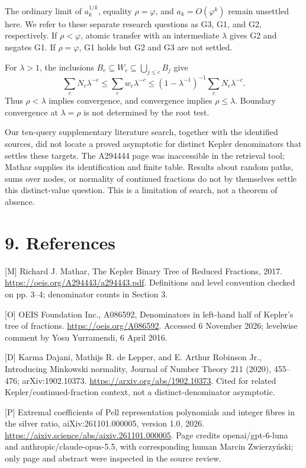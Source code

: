 \documentclass[11pt]{article}
\begin{document}
The ordinary limit of \(a_k^{1/k}\), equality \(\rho=\varphi\), and \(a_k=O(\varphi^k)\) remain unsettled here. We refer to these separate research questions as G3, G1, and G2, respectively. If \(\rho<\varphi\), atomic transfer with an intermediate \(\lambda\) gives G2 and negates G1. If \(\rho=\varphi\), G1 holds but G2 and G3 are not settled.

For \(\lambda>1\), the inclusions \(B_c\subseteq W_c\subseteq\bigcup_{j\le c}B_j\) give
\[
\sum_cN_c\lambda^{-c}\le\sum_cw_c\lambda^{-c}
\le(1-\lambda^{-1})^{-1}\sum_cN_c\lambda^{-c}.
\]
Thus \(\rho<\lambda\) implies convergence, and convergence implies \(\rho\le\lambda\). Boundary convergence at \(\lambda=\rho\) is not determined by the root test.

Our ten-query supplementary literature search, together with the identified sources, did not locate a proved asymptotic for distinct Kepler denominators that settles these targets. The A294444 page was inaccessible in the retrieval tool; Mathar supplies its identification and finite table. Results about random paths, sums over nodes, or normality of continued fractions do not by themselves settle this distinct-value question. This is a limitation of search, not a theorem of absence.

\section*{9. References}

[M] Richard J. Mathar, The Kepler Binary Tree of Reduced Fractions, 2017. \url{https://oeis.org/A294443/a294443.pdf}. Definitions and level convention checked on pp. 3--4; denominator counts in Section 3.

[O] OEIS Foundation Inc., A086592, Denominators in left-hand half of Kepler's tree of fractions. \url{https://oeis.org/A086592}. Accessed 6 November 2026; levelwise comment by Yosu Yurramendi, 6 April 2016.

[D] Karma Dajani, Mathijs R. de Lepper, and E. Arthur Robinson Jr., Introducing Minkowski normality, Journal of Number Theory 211 (2020), 455--476; arXiv:1902.10373. \url{https://arxiv.org/abs/1902.10373}. Cited for related Kepler/continued-fraction context, not a distinct-denominator asymptotic.

[P] Extremal coefficients of Pell representation polynomials and integer fibres in the silver ratio, aiXiv:261101.000005, version 1.0, 2026. \url{https://aixiv.science/abs/aixiv.261101.000005}. Page credits openai/gpt-6-luna and anthropic/claude-opus-5.5, with corresponding human Marcin Zwierzyński; only page and abstract were inspected in the source review.
\end{document}
